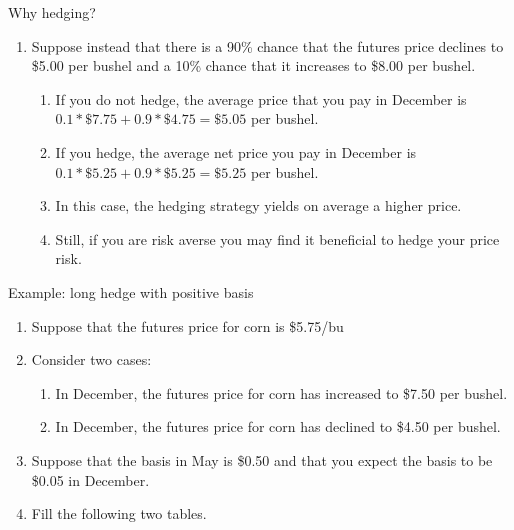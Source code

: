 \documentclass[table,xcolor=pdftex,dvipsnames]{beamer}\usepackage[]{graphicx}\usepackage[]{color}
\begin{document}

\begin{frame}{Why hedging?}
\begin{enumerate}[label=\textbullet]
  \item Suppose instead that there is a 90\% chance that the futures price declines to \$5.00 per bushel and a 10\% chance that it increases to \$8.00 per bushel.
      \begin{enumerate}[label=-]
            \item If you do not hedge, the average price that you pay in December is $0.1*\$7.75+0.9*\$4.75 = \$5.05$ per bushel.
            \item If you hedge, the average net price you pay in December is $0.1*\$5.25+0.9*\$5.25 = \$5.25$ per bushel.
            \item In this case, the hedging strategy yields on average a higher price.
            \item Still, if you are risk averse you may find it beneficial to hedge your price risk.
      \end{enumerate}
\end{enumerate}
\end{frame}

\begin{frame}{Example: long hedge with positive basis}
\begin{enumerate}[label=\textbullet]
  \item Suppose that the futures price for corn is \$5.75/bu
  \item Consider two cases:
      \begin{enumerate}[label=\arabic*)]
            \item In December, the futures price for corn has increased to \$7.50 per bushel.
            \item In December, the futures price for corn has declined to \$4.50 per bushel.
      \end{enumerate}
  \item Suppose that the basis in May is \$0.50 and that you expect the basis to be \$0.05 in December.
  \item Fill the following two tables.
\end{enumerate}
\end{frame}

\end{document}
